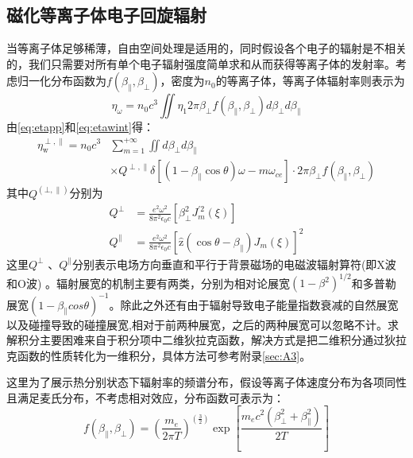 \subsection{磁化等离子体电子回旋辐射}
当等离子体足够稀薄，自由空间处理是适用的，同时假设各个电子的辐射是不相关的，我们只需要对所有单个电子辐射强度简单求和从而获得等离子体的发射率。考虑归一化分布函数为$f(β_∥,β_⊥ )$，密度为$n_0$的等离子体，等离子体辐射率则表示为
\begin{equation}\label{eq:etawint}
\eta_{\omega}=n_{0} c^{3} \iint \eta_{1}  2 \pi \beta_{\perp} f\left(\beta_{\|}, \beta_{\perp}\right) d \beta_{\perp} d \beta_{\|}
\end{equation}
由\autoref{eq:etapp}和\autoref{eq:etawint}得：
\begin{equation}
\begin{aligned}\eta_{\mathrm{w}}^{\perp, \|}=n_{0} c^{3} & \sum_{m=1}^{+\infty} \iint d \beta_{\perp} d \beta_{\|}  \\& \times Q^{\perp, \|} \delta\left[\left(1-\beta_{\|} \cos \theta\right) \omega-m \omega_{c e}\right] \cdot 2 \pi \beta_{\perp} f\left(\beta_{\|}, \beta_{\perp}\right)\end{aligned}
\end{equation}
其中$Q^{(⊥,∥)}$分别为
\begin{subequations}
\begin{align}
Q^{\perp} & = \frac{e^{2} \omega^{2}}{8 \pi^{2} \epsilon_{0} c}\left[\beta_{\perp}^{2} J_{m}^{\prime 2}(\xi)\right] \\
Q^{\|} & = \frac{e^{2} \omega^{2}}{8 \pi^{2} \epsilon_{0} c}\left[\hat{\mathrm{z}}\left(\cos \theta-\beta_{\|}\right) J_{m}(\xi)\right]^{2}
\end{align}
\end{subequations}
这里$Q^⊥$ 、$Q^∥$分别表示电场方向垂直和平行于背景磁场的电磁波辐射算符(即X波和O波) 。辐射展宽的机制主要有两类，分别为相对论展宽$(1-β^2 )^{1/2}$和多普勒展宽$(1-β_∥ cosθ)^{-1}$。除此之外还有由于辐射导致电子能量指数衰减的自然展宽以及碰撞导致的碰撞展宽,相对于前两种展宽，之后的两种展宽可以忽略不计\cite{RN1900}。求解积分主要困难来自于积分项中二维狄拉克函数，解决方式是把二维积分通过狄拉克函数的性质转化为一维积分，具体方法可参考附录\autoref{sec:A3}。\par
  这里为了展示热分别状态下辐射率的频谱分布，假设等离子体速度分布为各项同性且满足麦氏分布，不考虑相对效应，分布函数可表示为：
\begin{equation}
f\left(\beta_{\|}, \beta_{\perp}\right)=\left(\frac{m_{e}}{2 \pi T}\right)^{\left(\frac{3}{2}\right)} \exp \left[\frac{m_{e} c^{2}\left(\beta_{\perp}^{2}+\beta_{\|}^{2}\right)}{2 T}\right]
\end{equation}\par
